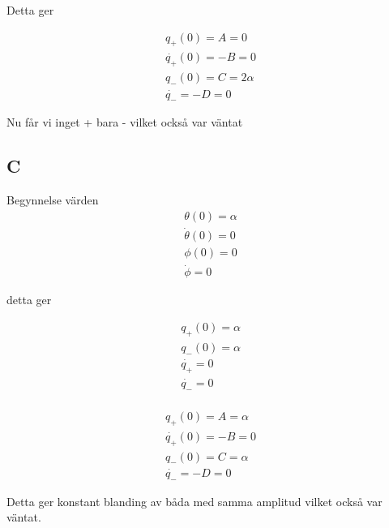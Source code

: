 \documentclass[a4paper]{article}
\begin{document}
Detta ger

\begin{align}
    q_+(0) = A = 0\\
    \dot{q_+}(0) = -B = 0 \\
    q_-(0) = C = 2 \alpha \\
    \dot{q_-} = -D = 0
\end{align}

Nu får vi inget + bara - vilket också var väntat

\subsection*{C}

Begynnelse värden
\begin{align}
    \theta(0) = \alpha\\
    \dot{\theta}(0) = 0 \\
    \phi(0) = 0 \\
    \dot{\phi} = 0
\end{align}

detta ger

\begin{align}
    q_+(0) = \alpha \\
    q_-(0) = \alpha \\
    \dot{q_+} = 0 \\
    \dot{q_-} = 0 \\
\end{align}

\begin{align}
    q_+(0) = A = \alpha\\
    \dot{q_+}(0) = -B = 0 \\
    q_-(0) = C = \alpha \\
    \dot{q_-} = -D = 0
\end{align}

Detta ger konstant blanding av båda med samma amplitud vilket också var väntat.
\end{document}
